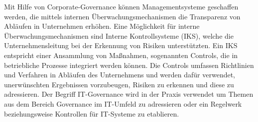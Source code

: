 \bigbreak
Mit Hilfe von Corporate-Governance können Managementsysteme geschaffen werden, die mittels internen Überwachungsmechanismen die Transparenz von Abläufen in Unternehmen erhöhen. Eine Möglichkeit für interne Überwachungsmechanismen sind \glqq{}Interne Kontrollsysteme\grqq{} (IKS), welche die Unternehmensleitung bei der Erkennung von Risiken unterstützten. Ein IKS entspricht einer Ansammlung von Maßnahmen, sogenannten Controls, die in betriebliche Prozesse integriert werden können. Die Controls umfassen Richtlinien und Verfahren in Abläufen des Unternehmens und werden dafür verwendet, unerwünschten Ergebnissen vorzubeugen, Risiken zu erkennen und diese zu adressieren. Der Begriff \glqq{}IT-Governance\grqq{} wird in der Praxis verwendet um Themen aus dem Bereich Governance im IT-Umfeld zu adressieren oder ein Regelwerk beziehungsweise Kontrollen für IT-Systeme zu  etablieren. \autocite{FalkMichael2012IidC}
